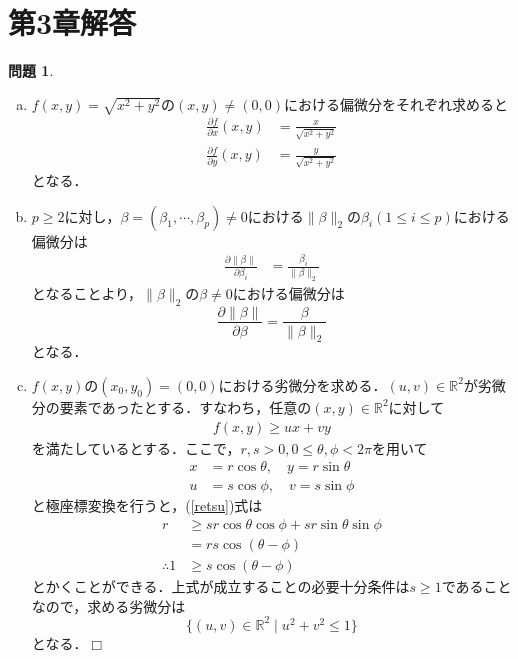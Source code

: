 \documentclass[titlepage]{jsarticle}
\theoremstyle{definition}
\newtheorem{Ex}{問題}
\theoremstyle{mystyle} %
\def\qed{\hfill$\Box$}
\begin{document}
\section{第3章解答}
\begin{Ex}
\begin{enumerate}[(a)]
  \item $f(x,y)=\sqrt{x^2+y^2}$の$(x,y)\neq (0,0)$における偏微分をそれぞれ求めると
  \begin{align*}
    \frac{\partial f}{\partial x}(x,y)&=\frac{x}{\sqrt{x^2+y^2}}\\
    \frac{\partial f}{\partial y}(x,y)&=\frac{y}{\sqrt{x^2+y^2}}
  \end{align*}
となる．\\

\item $p\geq 2$に対し，$\beta=(\beta_1,\cdots,\beta_p)\neq 0$における$\|\beta\|_2$の$\beta_i(1\leq i\leq p)$における偏微分は
\begin{align*}
  \frac{\partial \|\beta\|}{\partial \beta_i}&=\frac{\beta_i}{\|\beta\|_2}
\end{align*}
となることより，$\|\beta\|_2$の$\beta\neq 0$における偏微分は
$$\frac{\partial \|\beta\|}{\partial \beta}=\frac{\beta}{\|\beta\|_2}$$
となる．\\

\item $f(x,y)$の$(x_0,y_0)=(0,0)$における劣微分を求める．$(u,v)\in\mathbb{R}^2$が劣微分の要素であったとする．すなわち，任意の$(x,y)\in \mathbb{R}^2$に対して
\begin{align}
  \label{retsu}
  f(x,y)\geq ux+vy
\end{align}
を満たしているとする．ここで，$r,s>0,0\leq \theta,\phi< 2\pi$を用いて
\begin{align*}
  x&=r\cos\theta,\quad y =r\sin\theta\\
  u&=s\cos\phi,\quad v = s\sin\phi
\end{align*}
と極座標変換を行うと，(\ref{retsu})式は
\begin{align*}
  r&\geq sr\cos\theta\cos\phi+sr\sin\theta\sin\phi\\
&=rs\cos(\theta-\phi)\\
\therefore 1&\geq s\cos(\theta-\phi)
\end{align*}
とかくことができる．上式が成立することの必要十分条件は$s\geq 1$であることなので，求める劣微分は
$$\{(u,v)\in\mathbb{R}^2\mid u^2+v^2\leq 1\}$$
となる．\qed
\end{enumerate}
\end{Ex}
\end{document}
